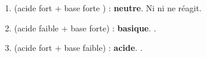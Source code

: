 \documentclass[11pt,a4paper]{article}
\begin{document}
\begin{corrige}
\begin{enumerate}[label=\alph*)]
  \item {} (acide fort  + base forte ) : \textbf{neutre}. Ni  ni  ne réagit.
  \item {} (acide faible + base forte) : \textbf{basique}. .
  \item {} (acide fort + base faible) : \textbf{acide}. .
\end{enumerate}
\end{corrige}
\end{document}
